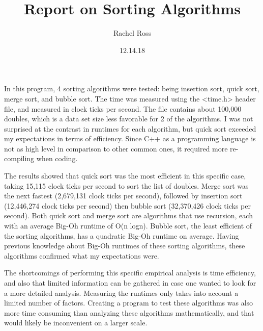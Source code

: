\documentclass[12pt]{article}
\title{Report on Sorting Algorithms}
\author{Rachel Ross}
\date{12.14.18}
\begin{document}
\begin{multicols}{2}
\maketitle 

In this program, 4 sorting algorithms were tested: being insertion sort, quick sort, merge sort, and bubble sort. The time was measured using the <time.h> header file, and measured in clock ticks per second. The file contains about 100,000 doubles, which is a data set size less favorable for 2 of the algorithms. I was not surprised at the contrast in runtimes for each algorithm, but quick sort exceeded my expectations in terms of efficiency. Since C++ as a programming language is not as high level in comparison to other common ones, it required more re-compiling when coding. 

The results showed that quick sort was the most efficient in this specific case, taking 15,115 clock ticks per second to sort the list of doubles. Merge sort was the next fastest (2,679,131 clock ticks per second), followed by insertion sort (12,446,274 clock ticks per second) then bubble sort (32,370,426 clock ticks per second). Both quick sort and merge sort are algorithms that use recursion, each with an average Big-Oh runtime of O(n logn). Bubble sort, the least efficient of the sorting algorithms, has a quadratic Big-Oh runtime on average. Having previous knowledge about Big-Oh runtimes of these sorting algorithms, these algorithms confirmed what my expectations were. 

The shortcomings of performing this specific empirical analysis is time efficiency, and also that limited information can be gathered in case one wanted to look for a more detailed analysis. Measuring the runtimes only takes into account a limited number of factors. Creating a program to test these algorithms was also more time consuming than analyzing these algorithms mathematically, and that would likely be inconvenient on a larger scale. 

\end{multicols}
\end{document}
